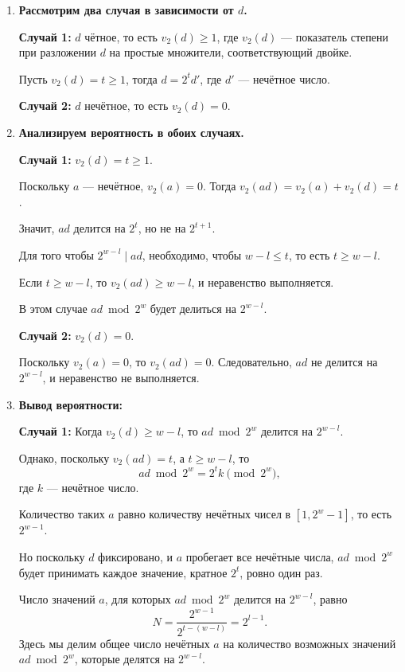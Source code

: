 \documentclass[11pt]{article}
\renewcommand{\le}{\leqslant}   %
\renewcommand{\ge}{\geqslant}   %
\begin{document}
\begin{solution}
\begin{enumerate}
        \item \textbf{Рассмотрим два случая в зависимости от $d$.}
    
        \textbf{Случай 1:} $d$ чётное, то есть $v_2(d) \ge 1$, где $v_2(d)$ — показатель степени при разложении $d$ на простые множители, соответствующий двойке.
    
        Пусть $v_2(d) = t \ge 1$, тогда $d = 2^t d'$, где $d'$ — нечётное число.
    
        \textbf{Случай 2:} $d$ нечётное, то есть $v_2(d) = 0$.
    
        \item \textbf{Анализируем вероятность в обоих случаях.}
    
        \textbf{Случай 1:} $v_2(d) = t \ge 1$.
    
        Поскольку $a$ — нечётное, $v_2(a) = 0$. Тогда $v_2(a d) = v_2(a) + v_2(d) = t$.
    
        Значит, $a d$ делится на $2^t$, но не на $2^{t + 1}$.
    
        Для того чтобы $2^{w - l} \mid a d$, необходимо, чтобы $w - l \le t$, то есть $t \ge w - l$.
    
        Если $t \ge w - l$, то $v_2(a d) \ge w - l$, и неравенство выполняется.
    
        В этом случае $a d \bmod 2^w$ будет делиться на $2^{w - l}$.
    
        \textbf{Случай 2:} $v_2(d) = 0$.
    
        Поскольку $v_2(a) = 0$, то $v_2(a d) = 0$. Следовательно, $a d$ не делится на $2^{w - l}$, и неравенство не выполняется.
    
        \item \textbf{Вывод вероятности:}
    
        \textbf{Случай 1:} Когда $v_2(d) \ge w - l$, то $a d \bmod 2^w$ делится на $2^{w - l}$.
    
        Однако, поскольку $v_2(a d) = t$, а $t \ge w - l$, то
        \[
        a d \bmod 2^w = 2^{t} k \pmod{2^w},
        \]
        где $k$ — нечётное число.
    
        Количество таких $a$ равно количеству нечётных чисел в $[1, 2^w - 1]$, то есть $2^{w - 1}$.
    
        Но поскольку $d$ фиксировано, и $a$ пробегает все нечётные числа, $a d \bmod 2^w$ будет принимать каждое значение, кратное $2^{t}$, ровно один раз.
    
        Число значений $a$, для которых $a d \bmod 2^w$ делится на $2^{w - l}$, равно
        \[
        N = \dfrac{2^{w - 1}}{2^{t - (w - l)}} = 2^{l - 1}.
        \]
        Здесь мы делим общее число нечётных $a$ на количество возможных значений $a d \bmod 2^w$, которые делятся на $2^{w - l}$.
    

\end{enumerate}
\end{solution}
\end{document}
